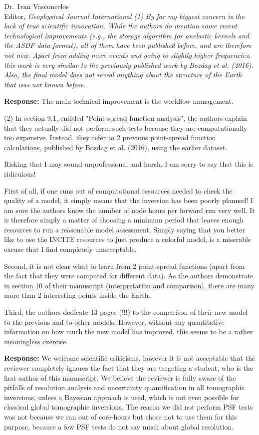 \documentclass[11pt,a4paper]{letter}
\newcommand{\response}[1]{\textbf{Response:} #1}
\newcommand{\rev}[1]{{\it{#1}}}
\begin{document}
\begin{letter}{Dr.~Ivan Vasconcelos\\
Editor, \textit{Geophysical Journal International}}
\rev{(1) By far my biggest concern is the lack of true scientific innovation. While the authors do mention some recent technological improvements (e.g., the storage algorithm for anelastic kernels and the ASDF data format), all of them have been published before, and are therefore not new. Apart from adding more events and going to slightly higher frequencies, this work is very similar to the previously published work by Bozdag et al. (2016). Also, the final model does not reveal anything about the structure of the Earth that was not known before.
}

\response{The main technical improvement is the workflow management.}


\rev{(2) In section 9.1, entitled "Point-spread function analysis", the authors explain that they actually did not perform such tests because they are computationally too expensive. Instead, they refer to 2 previous point-spread function calculations, published by Bozdag et al. (2016), using the earlier dataset. 

Risking that I may sound unprofessional and harsh, I am sorry to say that this is ridiculous!

First of all, if one runs out of computational resources needed to check the quality of a model, it simply means that the inversion has been poorly planned! I am sure the authors know the number of node hours per forward run very well. It is therefore simply a matter of choosing a minimum period that leaves enough resources to run a reasonable model assessment. Simply saying that you better like to use the INCITE resources to just produce a colorful model, is a miserable excuse that I find completely unacceptable.

Second, it is not clear what to learn from 2 point-spread functions (apart from the fact that they were computed for different data). As the authors demonstrate in section 10 of their manuscript (interpretation and comparison), there are many more than 2 interesting points inside the Earth.

Third, the authors dedicate 13 pages (!!!) to the comparison of their new model to the previous and to other models. However, without any quantitative information on how much the new model has improved, this seems to be a rather meaningless exercise.
}

\response{We welcome scientific criticisms, however it is not acceptable that the reviewer completely ignores the fact that they are targeting a student,
who is the first author of this manuscript.
We believe the reviewer is fully aware of the pitfalls of resolution analysis and uncertainty quantification in all tomographic inversions, unless a Bayesian approach is used, which is not even possible for classical global tomographic inversions.
The reason we did not perform PSF tests was not because we ran out of core-hours but chose not to use them for this purpose,
because a few PSF tests do not say much about global resolution.
}


\end{letter}
\end{document}
